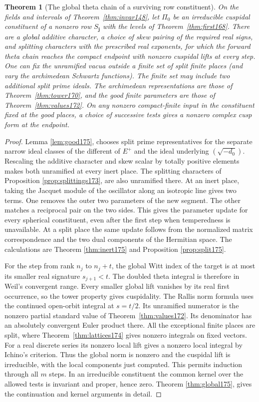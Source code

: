 \documentclass[a4paper,11pt]{article}
\newtheorem{theorem}[proposition]{Theorem}
\theoremstyle{definition}
\theoremstyle{remark}
\numberwithin{equation}{section}
\begin{document}
\begin{theorem}[The global theta chain of a surviving row constituent]
\label{thm:global176}
On the fields and intervals of Theorem~\ref{thm:invar148},
let \(\Pi_0\) be an irreducible cuspidal constituent of a nonzero
row \(S_{\boldsymbol j}\) with the levels of
Theorem~\ref{thm:first168}. There are a global additive
character, a choice of skew pairing of the required real
signs, and splitting characters with the prescribed real
exponents, for which the forward theta chain reaches the
compact endpoint with nonzero cuspidal lifts at every step.
One can fix the unramified vacua outside a finite set of
split finite places (and vary the archimedean Schwartz
functions). The finite set may include two additional split
prime ideals. The archimedean representations are those of
Theorem~\ref{thm:tower170}, and the good finite parameters
are those of Theorem~\ref{thm:values172}. On any nonzero
compact-finite input in the constituent fixed at the good
places, a choice of successive tests gives a nonzero
complex cusp form at the endpoint.
\end{theorem}
\begin{proof}
Lemma \ref{lem:good175}, chooses split prime representatives
for the separate narrow ideal classes of the different of
\(E^+\) and the ideal underlying \((\sqrt{-d_0})\).
Rescaling the additive character and skew scalar by totally
positive elements makes both unramified at every inert place.
The splitting characters of Proposition \ref{prop:splittings173},
are also unramified there. At an inert place, taking
the Jacquet module of the oscillator along an isotropic line
gives two terms. One removes the outer two parameters of
the new segment. The other matches a reciprocal pair on
the two sides. This gives the parameter update for every
spherical constituent, even after the first step when
temperedness is unavailable. At a split place the same
update follows from the normalized matrix correspondence
and the two dual components of the Hermitian space. The
calculations are Theorem \ref{thm:inert175} and Proposition \ref{prop:split175}.

For the step from rank \(n_j\) to \(n_j+t\), the global Witt
index of the target is at most its smaller real signature
\(s_{j+1}<t\). The doubled theta integral is therefore
in Weil's convergent range. Every smaller global lift
vanishes by its real first occurrence, so the tower
property gives cuspidality. The Rallis norm formula uses
the continued open-orbit integral at \(s=t/2\). Its
unramified numerator is the nonzero partial standard
value of Theorem~\ref{thm:values172}. Its denominator has
an absolutely convergent Euler product there. All the
exceptional finite places are split, where
Theorem~\ref{thm:lattices174} gives nonzero integrals on
fixed vectors. For a real discrete series its nonzero
local lift gives a nonzero local integral by Ichino's
criterion. Thus the global norm is nonzero and the
cuspidal lift is irreducible, with the local components
just computed. This permits induction through all \(m\)
steps. In an irreducible constituent the common kernel
over the allowed tests is invariant and proper, hence
zero. Theorem \ref{thm:global175}, gives the continuation and
kernel arguments in detail.
\end{proof}
\end{document}
